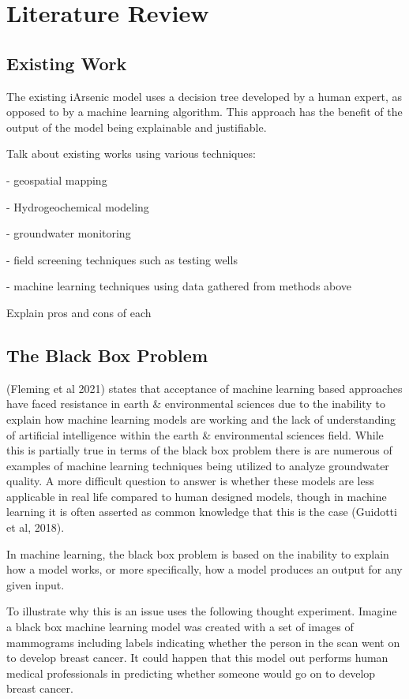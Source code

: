 \chapter{Literature Review}

\section{Existing Work}

The existing iArsenic model uses a decision tree developed by a human expert, as opposed to by a machine learning algorithm. This approach has the benefit of the output of the model being explainable and justifiable.

Talk about existing works using various techniques:

- geospatial mapping

- Hydrogeochemical modeling

- groundwater monitoring

- field screening techniques such as testing wells

- machine learning techniques using data gathered from methods above

Explain pros and cons of each

\section{The Black Box Problem}

(Fleming et al 2021) states that acceptance of machine learning based approaches have faced resistance in earth \& environmental sciences due to the inability to explain how machine learning models are working and the lack of understanding of artificial intelligence within the earth \& environmental sciences field. While this is partially true in terms of the black box problem there is are numerous of examples of machine learning techniques being utilized to analyze groundwater quality. A more difficult question to answer is whether these models are less applicable in real life compared to human designed models, though in machine learning it is often asserted as common knowledge that this is the case (Guidotti et al, 2018).

In machine learning, the black box problem is based on the inability to explain how a model works, or more specifically, how a model produces an output for any given input.

To illustrate why this is an issue \cite{Castelvecchi2016} uses the following thought experiment. Imagine a black box machine learning model was created with a set of images of mammograms including labels indicating whether the person in the scan went on to develop breast cancer. It could happen that this model out performs human medical professionals in predicting whether someone would go on to develop breast cancer.

